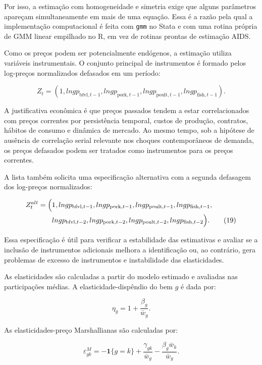 \documentclass[12pt,a4paper]{article}
\begin{document}
Por isso, a estimação com homogeneidade e simetria exige que alguns parâmetros apareçam simultaneamente em mais de uma equação. Essa é a razão pela qual a implementação computacional é feita com \texttt{gmm} no Stata e com uma rotina própria de GMM linear empilhado no R, em vez de rotinas prontas de estimação AIDS.

Como os preços podem ser potencialmente endógenos, a estimação utiliza variáveis instrumentais. O conjunto principal de instrumentos é formado pelos log-preços normalizados defasados em um período:

\[
Z_t
=
\left(
1,
lngp_{\text{bfvl},t-1},
lngp_{\text{pork},t-1},
lngp_{\text{poult},t-1},
lngp_{\text{fish},t-1}
\right).
\tag{18}
\label{eq:instrumentos_lag1}
\]

A justificativa econômica é que preços passados tendem a estar correlacionados com preços correntes por persistência temporal, custos de produção, contratos, hábitos de consumo e dinâmica de mercado. Ao mesmo tempo, sob a hipótese de ausência de correlação serial relevante nos choques contemporâneos de demanda, os preços defasados podem ser tratados como instrumentos para os preços correntes.

A lista também solicita uma especificação alternativa com a segunda defasagem dos log-preços normalizados:

\begin{align}
Z_t^{alt}
=
\Big(
&1,
lngp_{\text{bfvl},t-1},
lngp_{\text{pork},t-1},
lngp_{\text{poult},t-1},
lngp_{\text{fish},t-1},
\notag\\
&lngp_{\text{bfvl},t-2},
lngp_{\text{pork},t-2},
lngp_{\text{poult},t-2},
lngp_{\text{fish},t-2}
\Big).
\tag{19}
\label{eq:instrumentos_lag2}
\end{align}

Essa especificação é útil para verificar a estabilidade das estimativas e avaliar se a inclusão de instrumentos adicionais melhora a identificação ou, ao contrário, gera problemas de excesso de instrumentos e instabilidade das elasticidades.

As elasticidades são calculadas a partir do modelo estimado e avaliadas nas participações médias. A elasticidade-dispêndio do bem \(g\) é dada por:

\[
\eta_g
=
1
+
\frac{\beta_g}{\bar{w}_g}.
\tag{20}
\label{eq:elasticidade_dispendio}
\]

As elasticidades-preço Marshallianas são calculadas por:

\[
\varepsilon_{gk}^{M}
=
-
\mathbf{1}\{g=k\}
+
\frac{\gamma_{gk}}{\bar{w}_g}
-
\frac{\beta_g\bar{w}_k}{\bar{w}_g}.
\tag{21}
\label{eq:elasticidade_marshalliana}
\]
\end{document}
